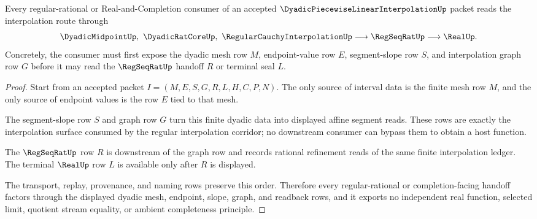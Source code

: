 \begin{theorem}
\label{thm:dyadic-piecewise-linear-interpolation-regseqrat-handoff}
Every regular-rational or Real-and-Completion consumer of an accepted $\DyadicPiecewiseLinearInterpolationUp$ packet reads the interpolation route through
$$
\DyadicMidpointUp,\ \DyadicRatCoreUp,\ \RegularCauchyInterpolationUp \longrightarrow \RegSeqRatUp \longrightarrow \RealUp .
$$
Concretely, the consumer must first expose the dyadic mesh row $M$, endpoint-value row $E$, segment-slope row $S$, and interpolation graph row $G$ before it may read the $\RegSeqRatUp$ handoff $R$ or terminal seal $L$.
\end{theorem}
\begin{proof}
Start from an accepted packet $I=(M,E,S,G,R,L,H,C,P,N)$. The only source of interval data is the finite mesh row $M$, and the only source of endpoint values is the row $E$ tied to that mesh.

The segment-slope row $S$ and graph row $G$ turn this finite dyadic data into displayed affine segment reads. These rows are exactly the interpolation surface consumed by the regular interpolation corridor; no downstream consumer can bypass them to obtain a host function.

The $\RegSeqRatUp$ row $R$ is downstream of the graph row and records rational refinement reads of the same finite interpolation ledger. The terminal $\RealUp$ row $L$ is available only after $R$ is displayed.

The transport, replay, provenance, and naming rows preserve this order. Therefore every regular-rational or completion-facing handoff factors through the displayed dyadic mesh, endpoint, slope, graph, and readback rows, and it exports no independent real function, selected limit, quotient stream equality, or ambient completeness principle.
\end{proof}



